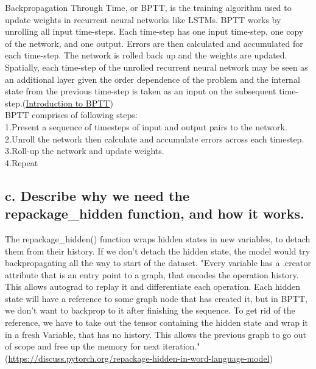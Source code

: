 \documentclass{article}
\begin{document}
Backpropagation Through Time, or BPTT, is the training algorithm used to update weights in recurrent neural networks like LSTMs. BPTT works by unrolling all input time-steps. Each time-step has one input time-step, one copy of the network, and one output. Errors are then calculated and accumulated for each time-step. The network is rolled back up and the weights are updated. Spatially, each time-step of the unrolled recurrent neural network may be seen as an additional layer given the order dependence of the problem and the internal state from the previous time-step is taken as an input on the subsequent time-step.(\href{https://machinelearningmastery.com/gentle-introduction-backpropagation-time/}{Introduction to BPTT})\\
BPTT comprises of following steps:\\
1.Present a sequence of timesteps of input and output pairs to the network.\\
2.Unroll the network then calculate and accumulate errors across each timestep.\\
3.Roll-up the network and update weights.\\
4.Repeat\\


\subsection*{c. Describe why we need the repackage\_hidden function, and how it works.}

The repackage\_hidden() function wraps hidden states in new variables, to detach them from their history. If we don't detach the hidden state, the model would try backpropagating all the way to start of the dataset.
"Every variable has a .creator attribute that is an entry point to a graph, that encodes the operation history. This allows autograd to replay it and differentiate each operation. Each hidden state will have a reference to some graph node that has created it, but in BPTT, we don't want to backprop to it after finishing the sequence. To get rid of the reference, we have to take out the tensor containing the hidden state and wrap it in a fresh Variable, that has no history. This allows the previous graph to go out of scope and free up the memory for next iteration." (\href{https://discuss.pytorch.org/t/help-clarifying-repackage-hidden-in-word-language-model/226/2}{https://discuss.pytorch.org/repackage-hidden-in-word-language-model})
\end{document}
